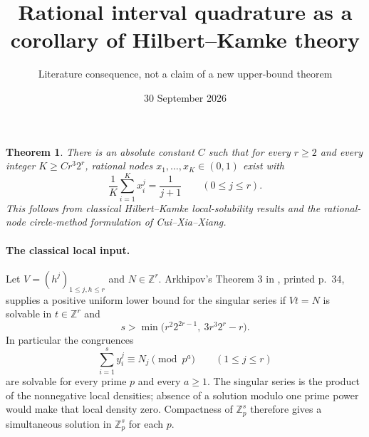 \documentclass[11pt]{article}
\title{Rational interval quadrature as a corollary of Hilbert--Kamke theory}
\author{Literature consequence, not a claim of a new upper-bound theorem}
\date{30 September 2026}
\newtheorem{theorem}{Theorem}
\begin{document}
\maketitle

\begin{theorem}\label{main}
There is an absolute constant $C$ such that for every $r\ge2$ and every
integer $K\ge Cr^3 2^r$, rational nodes $x_1,\ldots,x_K\in(0,1)$ exist
with
\[
 \frac1K\sum_{i=1}^K x_i^j=\frac1{j+1}\qquad(0\le j\le r).
\]
This follows from classical Hilbert--Kamke local-solubility results and
the rational-node circle-method formulation of Cui--Xia--Xiang.
\end{theorem}

\paragraph{The classical local input.}
Let $V=(h^j)_{1\le j,h\le r}$ and $N\in\mathbb Z^r$.
Arkhipov's Theorem 3 in \cite{ark85}, printed p.~34, supplies a
positive uniform lower bound for the singular series if $Vt=N$ is
solvable in $t\in\mathbb Z^r$ and
\[
 s>\min\bigl(r^2 2^{2r-1},\ 3r^3 2^r-r\bigr).
\]
In particular the congruences
\[
 \sum_{i=1}^s y_i^j\equiv N_j\pmod{p^a}\qquad(1\le j\le r)
\]
are solvable for every prime $p$ and every $a\ge1$. The singular series
is the product of the nonnegative local densities; absence of a
solution modulo one prime power would make that local density zero.
Compactness of $\mathbb Z_p^s$ therefore gives a simultaneous solution
in $\mathbb Z_p^s$ for each $p$.
\end{document}
